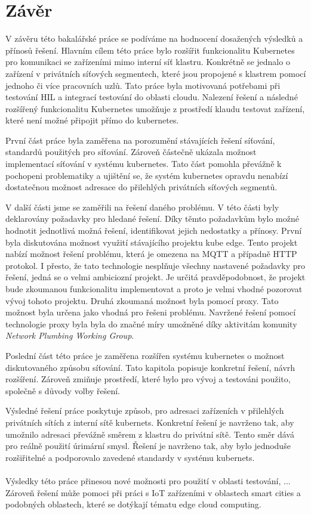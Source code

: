 \chapter{Závěr}
V závěru této bakalářské práce se podíváme na hodnocení dosažených výsledků a přínosů řešení. Hlavním cílem této práce bylo rozšířit funkcionalitu Kubernetes pro komunikaci se zařízeními mimo interní síť klastru. Konkrétně se jednalo o zařízení v privátních síťových segmentech, které jsou propojené s klastrem pomocí jednoho či více pracovních uzlů. Tato práce byla motivovaná potřebami při testování HIL a integrací testování do oblasti cloudu. Nalezení řešení a následné rozšířený funkcionalitu Kubernetes umožňuje z prostředí klaudu testovat zařízení, které není možné připojit přímo do kubernetes.    

První část práce byla zaměřena na porozumění stávajících řešení síťování, standardů použitých pro síťování. Zároveň částečně ukázala možnost implementací síťování v systému kubernetes. Tato část pomohla převážně k pochopeni problematiky a ujištění se, že systém kubernetes opravdu nenabízí dostatečnou možnost adresace do přilehlých privátních síťových segmentů.

V další části jsme se zaměřili na řešení daného problému. V této části byly deklarovány požadavky pro hledané řešení. Díky těmto požadavkům bylo možné hodnotit jednotlivá možná řešení, identifikovat jejich nedostatky a přínosy. První byla diskutována možnost využití stávajícího projektu kube edge. Tento projekt nabízí možnost řešení problému, která je omezena na MQTT a případně HTTP protokol. I přesto, že tato technologie nesplňuje všechny nastavené požadavky pro řešení, jedná se o velmi ambiciozní projekt. Je určitá pravděpodobnost, že projekt bude zkoumanou funkcionalitu implementovat a proto je velmi vhodné pozorovat vývoj tohoto projektu. Druhá zkoumaná možnost byla pomocí proxy. Tato možnost byla určena jako vhodná pro řešeni problému. Navržené řešení pomocí technologie proxy byla byla do značné míry umožněné díky aktivitám komunity \textit{Network Plumbing Working Group}.

Poslední část této práce je zaměřena rozšířen systému kubernetes o možnost diskutovaného způsobu síťování. Tato kapitola popisuje konkretní řešení, návrh rozšíření. Zároveň zmiňuje prostředí, které bylo pro vývoj a testováni použito, společně s důvody volby řešení.

Výsledné řešení práce poskytuje způsob, pro adresaci zařízeních v přilehlých privátních sítích z interní sítě kubernets. Konkretní řešení je navrženo tak, aby umožnilo adresaci převážně směrem z klastru do privátní sítě. Tento směr dává pro reálně použití úrimární smysl. Řešení je navrženo tak, aby bylo jednoduše rozšiřitelné a podporovalo zavedené standardy v systému kubernets.
\\\\
Výsledky této práce přinesou nové možnosti pro použití v oblasti testování, ... Zároveň řešení může pomoci při práci s IoT zařízeními v oblastech smart cities a podobných oblastech, které se dotýkají tématu edge cloud computing.

